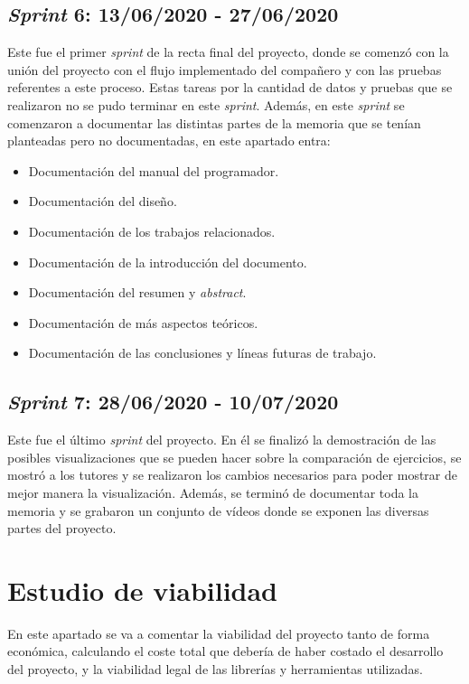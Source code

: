 \subsection{\textit{Sprint} 6: 13/06/2020 - 27/06/2020}
Este fue el primer \textit{sprint} de la recta final del proyecto, donde se comenzó con la unión del proyecto con el flujo implementado del compañero y con las pruebas referentes a este proceso. Estas tareas por la cantidad de datos y pruebas que se realizaron no se pudo terminar en este \textit{sprint}. Además, en este \textit{sprint} se comenzaron a documentar las distintas partes de la memoria que se tenían planteadas pero no documentadas, en este apartado entra:
\begin{itemize}
	\item Documentación del manual del programador.
	\item Documentación del diseño.
	\item Documentación de los trabajos relacionados.
	\item Documentación de la introducción del documento.
	\item Documentación del resumen y \textit{abstract}.
	\item Documentación de más aspectos teóricos.
	\item Documentación de las conclusiones y líneas futuras de trabajo.
\end{itemize}

\subsection{\textit{Sprint} 7: 28/06/2020 - 10/07/2020}
Este fue el último \textit{sprint} del proyecto. En él se finalizó la demostración de las posibles visualizaciones que se pueden hacer sobre la comparación de ejercicios, se mostró a los tutores y se realizaron los cambios necesarios para poder mostrar de mejor manera la visualización. Además, se terminó de documentar toda la memoria y se grabaron un conjunto de vídeos donde se exponen las diversas partes del proyecto.

\section{Estudio de viabilidad}

En este apartado se va a comentar la viabilidad del proyecto tanto de forma económica, calculando el coste total que debería de haber costado el desarrollo del proyecto, y la viabilidad legal de las librerías y herramientas utilizadas.

